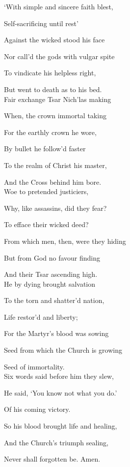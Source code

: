 \begin{multicols}{2}
`With simple and sincere faith blest,

Self-sacrificing until rest'

Against the wicked stood his face

Nor call'd the gods with vulgar spite

To vindicate his helpless right,

But went to death as to his bed.\\

Fair exchange Tsar Nich'las making

When, the crown immortal taking

For the earthly crown he wore,

By bullet he follow'd faster

To the realm of Christ his master,

And the Cross behind him bore.\\

Woe to pretended justiciers,

Why, like assassins, did they fear?

To efface their wicked deed?

From which men, then, were they hiding

But from God no favour finding

And their Tsar ascending high.\\


He by dying brought salvation

To the torn and shatter'd nation,

Life restor'd and liberty;

For the Martyr's blood was sowing

Seed from which the Church is growing

Seed of immortality.\\

Six words said before him they slew,


He said, `You know not what you do.'

Of his coming victory.

So his blood brought life and healing,

And the Church's triumph sealing,

Never shall forgotten be. Amen.
\end{multicols}

